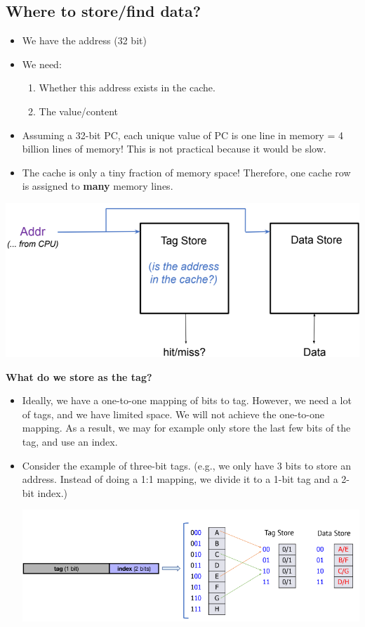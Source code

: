 \documentclass[10pt]{article}
\begin{document}
\subsection*{Where to store/find data?}
\begin{itemize}
    \item We have the address (32 bit)
    \item We need:
    \begin{enumerate}
        \item Whether this address exists in the cache.
        \item The value/content
    \end{enumerate}
    \item Assuming a 32-bit PC, each unique value of PC is one line in memory = 4 billion lines of memory!  This is not practical because it would be slow.
    \item The cache is only a tiny fraction of memory space!  Therefore, one cache row is assigned to \textbf{many} memory lines.
\end{itemize}
\begin{center}
    \includegraphics*[scale=0.8]{W6_7.png}
\end{center}
\textbf{What do we store as the tag?}
\begin{itemize}
    \item Ideally, we have a one-to-one mapping of bits to tag.  However, we need a lot of tags, and we have limited space.  We will not achieve the one-to-one mapping.  As a result, we may for example only store the last few bits of the tag, and use an index.
    \item Consider the example of three-bit tags.  (e.g., we only have 3 bits to store an address.  Instead of doing a 1:1 mapping, we divide it to a 1-bit tag and a 2-bit index.)
    \begin{center}
        \includegraphics*[scale=0.8]{W6_8.png}
    \end{center}
\end{itemize}
\end{document}
